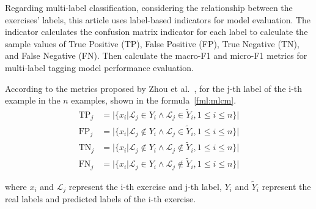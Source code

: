 
Regarding multi-label classification, considering the relationship between the exercises' labels, this article uses label-based indicators for model evaluation. The indicator calculates the confusion matrix indicator for each label to calculate the sample values of True Positive (TP), False Positive (FP), True Negative (TN), and False Negative (FN). Then calculate the macro-F1 and micro-F1 metrics for multi-label tagging model performance evaluation.

According to the metrics proposed by Zhou et al.~\cite{zhang2013review}, for the j-th label of the i-th example in the \(n\) examples, shown in the formula~\ref{fml:mlcm}.
\begin{equation}
	\begin{align}\label{fml:mlcm}
		\operatorname{TP}_j & =| \{x_i| \mathcal{L}_j\in Y_{i}\wedge \mathcal{L}_j \in \tilde{Y}_i , 1\leq i \leq n\}|       \\
		\operatorname{FP}_j & =| \{x_i| \mathcal{L}_j\notin Y_{i}\wedge \mathcal{L}_j \in \tilde{Y}_i , 1\leq i \leq n\}|    \\
		\operatorname{TN}_j & =| \{x_i| \mathcal{L}_j\notin Y_{i}\wedge \mathcal{L}_j \notin \tilde{Y}_i , 1\leq i \leq n\}| \\
		\operatorname{FN}_j & =| \{x_i| \mathcal{L}_j\in Y_{i}\wedge \mathcal{L}_j \notin \tilde{Y}_i , 1\leq i \leq n\}|
	\end{align}
\end{equation}

where \(x_i\) and \(\mathcal{L}_j\) represent the i-th exercise and j-th label, \(Y_i\) and \(\tilde{Y}_i\) represent the real labels and predicted labels of the i-th exercise.


